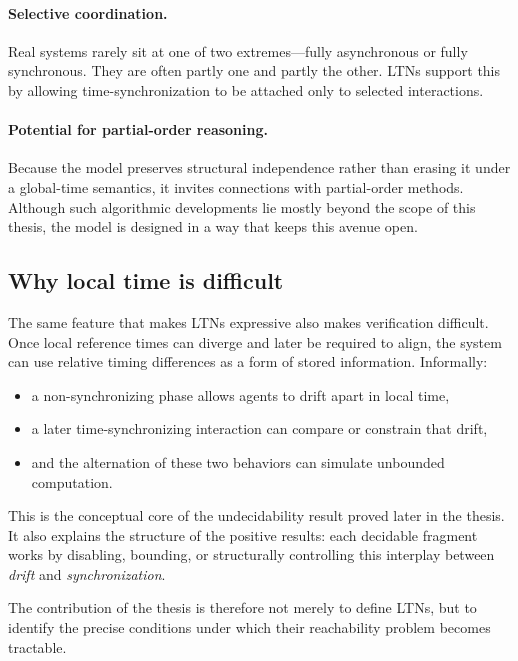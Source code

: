 \paragraph{Selective coordination.}
Real systems rarely sit at one of two extremes---fully asynchronous or fully synchronous. They are often partly one and partly the other. LTNs support this by allowing time-synchronization to be attached only to selected interactions.

\paragraph{Potential for partial-order reasoning.}
Because the model preserves structural independence rather than erasing it under a global-time semantics, it invites connections with partial-order methods. Although such algorithmic developments lie mostly beyond the scope of this thesis, the model is designed in a way that keeps this avenue open.

\subsection{Why local time is difficult}

The same feature that makes LTNs expressive also makes verification difficult. Once local reference times can diverge and later be required to align, the system can use relative timing differences as a form of stored information. Informally:
\begin{itemize}
    \item a non-synchronizing phase allows agents to drift apart in local time,
    \item a later time-synchronizing interaction can compare or constrain that drift,
    \item and the alternation of these two behaviors can simulate unbounded computation.
\end{itemize}

This is the conceptual core of the undecidability result proved later in the thesis. It also explains the structure of the positive results: each decidable fragment works by disabling, bounding, or structurally controlling this interplay between \emph{drift} and \emph{synchronization}.

The contribution of the thesis is therefore not merely to define LTNs, but to identify the precise conditions under which their reachability problem becomes tractable.


